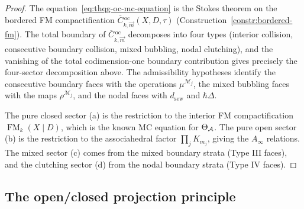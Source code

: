 \begin{proof}
The equation~\eqref{eq:thqg-oc-mc-equation} is the
Stokes theorem on the bordered FM compactification
$\overline{C}{}^{\,\mathrm{oc}}_{k, \vec{m}}(X, D, \tau)$
(Construction~\ref{constr:bordered-fm}). The total boundary of
$\overline{C}{}^{\,\mathrm{oc}}_{k, \vec{m}}$ decomposes into
four types (interior collision, consecutive boundary collision,
mixed bubbling, nodal clutching), and the vanishing of the total
codimension-one boundary contribution gives precisely the four-sector
decomposition above. The admissibility hypotheses identify the
consecutive boundary faces with the operations
$\mu^{\mathcal{M}_j}$, the mixed bubbling faces with the maps
$\rho^{\mathcal{M}_j}$, and the nodal faces with
$d_{\mathrm{sew}}$ and $\hbar\Delta$.

The pure closed sector (a) is the restriction to the interior FM
compactification $\operatorname{FM}_k(X \mathbin{|} D)$, which
is the known MC equation for $\Theta_{\mathcal{A}}$. The pure open sector (b)
is the restriction to the associahedral factor
$\prod_j K_{m_j}$, giving the $A_\infty$ relations. The mixed
sector (c) comes from the mixed boundary strata (Type III faces),
and the clutching sector (d) from the nodal boundary strata
(Type IV faces).
\end{proof}

\subsection{The open/closed projection principle}
\label{subsec:thqg-oc-projection}


